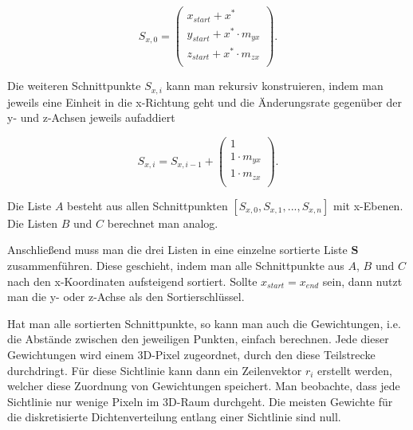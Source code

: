 \begin{equation}
  S_{x,0} = \begin{pmatrix}
    x_{start} + x^{\ast} \\
    y_{start} + x^{\ast} \cdot m_{yx} \\
    z_{start} + x^{\ast} \cdot m_{zx} \\
  \end{pmatrix}.
\end{equation}

Die weiteren Schnittpunkte $S_{x,i}$ kann man rekursiv konstruieren, indem man jeweils eine Einheit in die x-Richtung geht und die Änderungsrate gegenüber der y- und z-Achsen jeweils aufaddiert

\begin{equation}
  S_{x,i} = S_{x,i-1} + \begin{pmatrix}
    1 \\
    1 \cdot m_{yx} \\
    1 \cdot m_{zx} \\
  \end{pmatrix}.
\end{equation}

 Die Liste $A$ besteht aus allen Schnittpunkten $[S_{x,0}, S_{x,1}, ..., S_{x,n}]$ mit x-Ebenen. Die Listen $B$ und $C$ berechnet man analog.

Anschließend muss man die drei Listen in eine einzelne sortierte Liste $\mathbf{S}$ zusammenführen. Diese geschieht, indem man alle Schnittpunkte aus $A$, $B$ und $C$ nach den x-Koordinaten aufsteigend sortiert. Sollte $x_{start} = x_{end}$ sein, dann nutzt man die y- oder z-Achse als den Sortierschlüssel.

Hat man alle sortierten Schnittpunkte, so kann man auch die Gewichtungen, i.e. die Abstände zwischen den jeweiligen Punkten, einfach berechnen. Jede dieser Gewichtungen wird einem 3D-Pixel zugeordnet, durch den diese Teilstrecke durchdringt. Für diese Sichtlinie kann dann ein Zeilenvektor $r_i$ erstellt werden, welcher diese Zuordnung von Gewichtungen speichert. Man beobachte, dass jede Sichtlinie nur wenige Pixeln im 3D-Raum durchgeht. Die meisten Gewichte für die diskretisierte Dichtenverteilung entlang einer Sichtlinie sind null.


